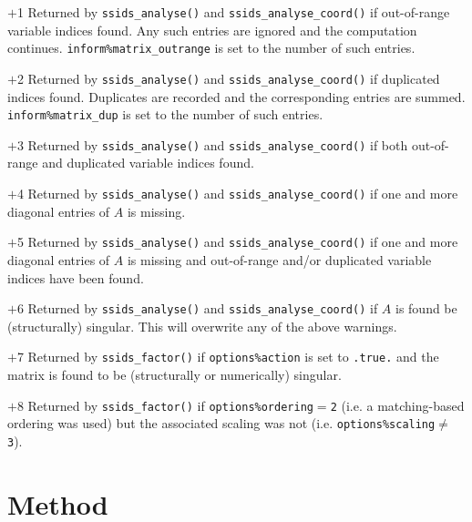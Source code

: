 \begin{description}
\item{$+$1} Returned by {\tt ssids\_analyse()}
and {\tt ssids\_analyse\_coord()} if out-of-range variable
indices found.
Any such entries are ignored  and the computation continues.
{\tt inform\%matrix\_outrange} is set to the number of such entries.

\item{$+$2} Returned by {\tt ssids\_analyse()} and {\tt ssids\_analyse\_coord()}
if duplicated indices found. Duplicates are recorded and the corresponding
entries are summed. {\tt inform\%matrix\_dup} is set to the number of such entries.

\item{$+$3} Returned by {\tt ssids\_analyse()} and {\tt ssids\_analyse\_coord()} if both
out-of-range and duplicated variable indices found.

\item{$+$4} Returned by {\tt ssids\_analyse()}  and {\tt ssids\_analyse\_coord()}
if  one and more diagonal entries
of $A$ is missing.

\item{$+$5} Returned by {\tt ssids\_analyse()}  and {\tt ssids\_analyse\_coord()}
if  one and more diagonal entries
of $A$ is missing  and
out-of-range and/or duplicated variable indices have been found.

\item{$+$6} Returned by {\tt ssids\_analyse()}  and {\tt ssids\_analyse\_coord()} if
$A$ is found be (structurally) singular. This will overwrite any of the above warnings.

\item{$+$7} Returned by {\tt ssids\_factor()} if {\tt options\%action} is set
to {\tt .true.} and the matrix is found to be (structurally or numerically)
singular.

\item{$+$8} Returned by {\tt ssids\_factor()} if
{\tt options\%ordering}$=${\tt 2} (i.e.
a matching-based ordering was used) but the associated scaling was not (i.e. {\tt options\%scaling}$\ne$
{\tt 3}).

\end{description}

\section{Method} \label{method}

